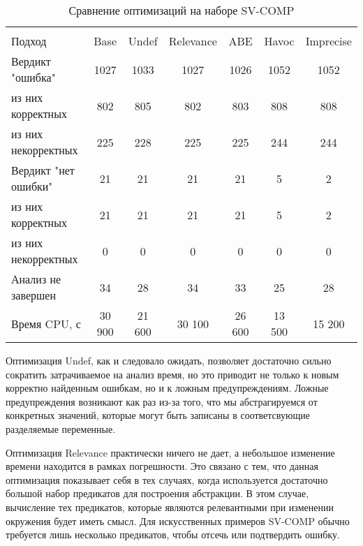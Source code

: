   \begin{table}[h]\footnotesize \centering
    \caption{Сравнение оптимизаций на наборе SV-COMP}
  	\label{table-sv-comp-opt}
    \begin{tabular}{ | l | c | c | c | c | c | c | }
      \hline
      		& 		\multicolumn{6}{c|}{\theory}  \\
      Подход         				& Base 	& Undef 	& Relevance & ABE 	& Havoc 	&  Imprecise \\ \hline
      Вердикт "ошибка" 				& 1027  & 1033  	& 1027      & 1026  & 1052     	& 1052       \\ 
  \hspace{0.5cm} из них корректных 	& 802 	& 805 		& 802     	& 803   & 808    	& 808     	\\ 
  \hspace{0.5cm} из них некорректных & 225 	& 228 		& 225     	& 225  	& 244      	& 244       \\ \hline
      Вердикт "нет ошибки"  		& 21    & 21    	& 21    	& 21   	& 5     	& 2       \\ 
  \hspace{0.5cm} из них корректных 	& 21 	& 21    	& 21     	& 21   	& 5     	& 2       \\
  \hspace{0.5cm} из них некорректных & 0 	& 0    		& 0     	& 0   	& 0     	& 0       \\ \hline
      Анализ не завершен       		& 34     & 28     	& 34     	& 33   	& 25     	& 28      	\\ \hline
      Время CPU, с   				& 30 900 & 21 600 	& 30 100  	& 26 600 & 13 500   & 15 200     	\\ 
      \hline
    \end{tabular}
  \end{table}

Оптимизация Undef, как и следовало ожидать, позволяет достаточно сильно сократить затрачиваемое на анализ время, но это приводит не только к новым корректно найденным ошибкам, но и к ложным предупреждениям.
Ложные предупреждения возникают как раз из-за того, что мы абстрагируемся от конкретных значений, которые могут быть записаны в соответсвующие разделяемые переменные. 

Оптимизация Relevance практически ничего не дает, а небольшое изменение времени находится в рамках погрешности. 
Это связано с тем, что данная оптимизация показывает себя в тех случаях, когда используется достаточно большой набор предикатов для построения абстракции.
В этом случае, вычисление тех предикатов, которые являются релевантными при изменении окружения будет иметь смысл.
Для искусственных примеров SV-COMP обычно требуется лишь несколько предикатов, чтобы отсечь или подтвердить ошибку.


